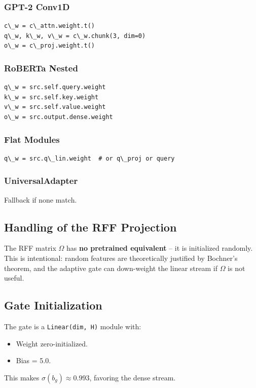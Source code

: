 \subsubsection{GPT-2 Conv1D}

\begin{lstlisting}
c\_w = c\_attn.weight.t()
q\_w, k\_w, v\_w = c\_w.chunk(3, dim=0)
o\_w = c\_proj.weight.t()
\end{lstlisting}

\subsubsection{RoBERTa Nested}

\begin{lstlisting}
q\_w = src.self.query.weight
k\_w = src.self.key.weight
v\_w = src.self.value.weight
o\_w = src.output.dense.weight
\end{lstlisting}

\subsubsection{Flat Modules}

\begin{lstlisting}
q\_w = src.q\_lin.weight  # or q\_proj or query
\end{lstlisting}

\subsubsection{UniversalAdapter}

Fallback if none match.

\subsection{Handling of the RFF Projection}

The RFF matrix $\Omega$ has \textbf{no pretrained equivalent} -- it is initialized 
randomly. This is intentional: random features are theoretically justified 
by Bochner's theorem, and the adaptive gate can down-weight the linear 
stream if $\Omega$ is not useful.

\subsection{Gate Initialization}

The gate is a \texttt{Linear(dim, H)} module with:

\begin{itemize}
\item Weight zero-initialized.
\item Bias = 5.0.

\end{itemize}
This makes $\sigma(b_g) \approx 0.993$, favoring the dense stream.

